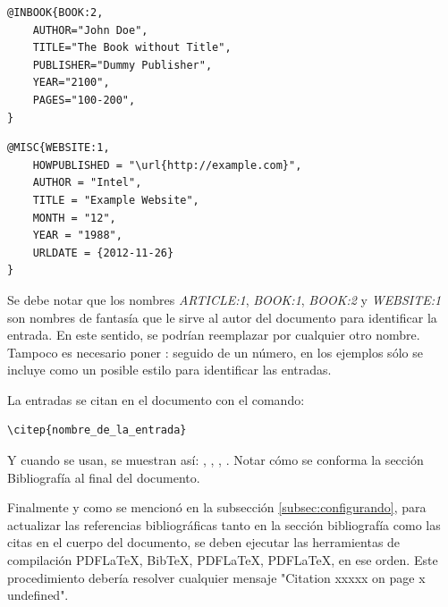 \begin{lstlisting}
@INBOOK{BOOK:2,
    AUTHOR="John Doe",
    TITLE="The Book without Title",
    PUBLISHER="Dummy Publisher",
    YEAR="2100",
    PAGES="100-200",
}
\end{lstlisting}


\begin{lstlisting}
@MISC{WEBSITE:1,
    HOWPUBLISHED = "\url{http://example.com}",
    AUTHOR = "Intel",
    TITLE = "Example Website",
    MONTH = "12",
    YEAR = "1988",
    URLDATE = {2012-11-26}
}
\end{lstlisting}

Se debe notar que los nombres \emph{ARTICLE:1}, \emph{BOOK:1}, \emph{BOOK:2} y \emph{WEBSITE:1} son nombres de fantasía que le sirve al autor del documento para identificar la entrada. En este sentido, se podrían reemplazar por cualquier otro nombre.  Tampoco es necesario poner : seguido de un número, en los ejemplos sólo se incluye como un posible estilo para identificar las entradas.

La entradas se citan en el documento con el comando: 

\begin{verbatim}
\citep{nombre_de_la_entrada}
\end{verbatim}

Y cuando se usan, se muestran así: \citep{ARTICLE:1}, \citep{BOOK:1}, \citep{BOOK:2}, \citep{WEBSITE:1}.  Notar cómo se conforma la sección Bibliografía al final del documento.

Finalmente y como se mencionó en la subsección \ref{subsec:configurando}, para actualizar las referencias bibliográficas tanto en la sección bibliografía como las citas en el cuerpo del documento, se deben ejecutar las herramientas de compilación PDFLaTeX, BibTeX, PDFLaTeX, PDFLaTeX, en ese orden.  Este procedimiento debería resolver cualquier mensaje "Citation xxxxx on page x undefined".
